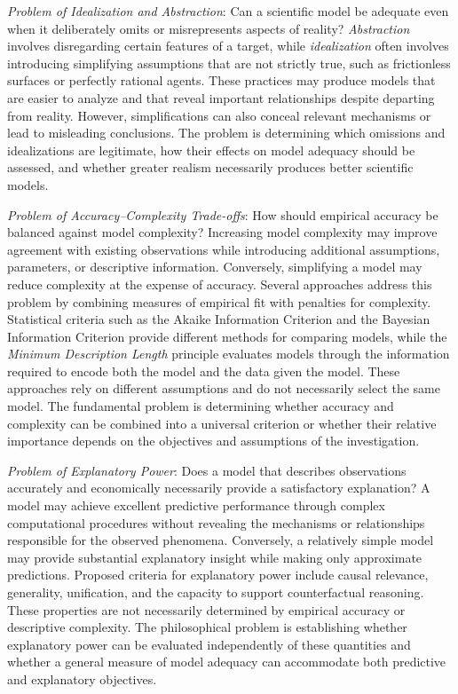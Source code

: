 \emph{Problem of Idealization and Abstraction}: Can a scientific model be adequate even when it deliberately omits or misrepresents aspects of reality? \emph{Abstraction} involves disregarding certain features of a target, while \emph{idealization} often involves introducing simplifying assumptions that are not strictly true, such as frictionless surfaces or perfectly rational agents. These practices may produce models that are easier to analyze and that reveal important relationships despite departing from reality. However, simplifications can also conceal relevant mechanisms or lead to misleading conclusions. The problem is determining which omissions and idealizations are legitimate, how their effects on model adequacy should be assessed, and whether greater realism necessarily produces better scientific models.

\emph{Problem of Accuracy--Complexity Trade-offs}: How should empirical accuracy be balanced against model complexity? Increasing model complexity may improve agreement with existing observations while introducing additional assumptions, parameters, or descriptive information. Conversely, simplifying a model may reduce complexity at the expense of accuracy. Several approaches address this problem by combining measures of empirical fit with penalties for complexity. Statistical criteria such as the Akaike Information Criterion and the Bayesian Information Criterion provide different methods for comparing models, while the \emph{Minimum Description Length} principle evaluates models through the information required to encode both the model and the data given the model. These approaches rely on different assumptions and do not necessarily select the same model. The fundamental problem is determining whether accuracy and complexity can be combined into a universal criterion or whether their relative importance depends on the objectives and assumptions of the investigation.

\emph{Problem of Explanatory Power}: Does a model that describes observations accurately and economically necessarily provide a satisfactory explanation? A model may achieve excellent predictive performance through complex computational procedures without revealing the mechanisms or relationships responsible for the observed phenomena. Conversely, a relatively simple model may provide substantial explanatory insight while making only approximate predictions. Proposed criteria for explanatory power include causal relevance, generality, unification, and the capacity to support counterfactual reasoning. These properties are not necessarily determined by empirical accuracy or descriptive complexity. The philosophical problem is establishing whether explanatory power can be evaluated independently of these quantities and whether a general measure of model adequacy can accommodate both predictive and explanatory objectives.

